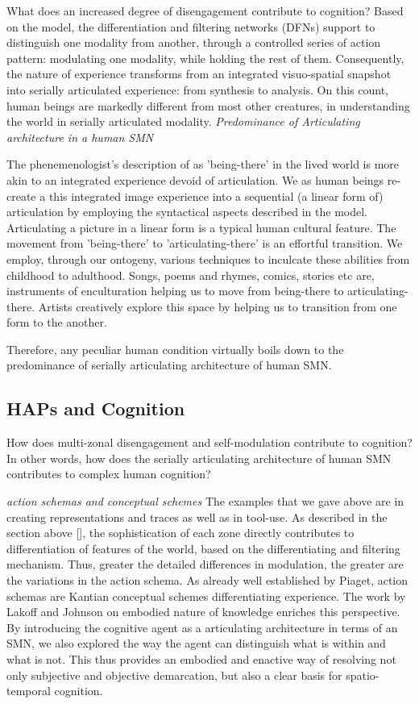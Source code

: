  What does an increased degree of disengagement contribute to cognition? Based on the model, the differentiation and filtering networks (DFNs) support to distinguish one modality from another, through a controlled series of action pattern: modulating one modality, while holding the rest of them. Consequently, the nature of experience transforms from an integrated visuo-spatial snapshot into serially articulated experience: from synthesis to analysis. On this count, human beings are markedly different from most other creatures, in understanding the world in serially articulated modality.  \emph{Predominance of Articulating architecture in a human SMN}

The phenemenologist's description of as 'being-there' in the lived world is more akin to an integrated experience devoid of articulation. We as human beings re-create a this integrated image experience into a sequential (a linear form of) articulation by employing the syntactical aspects described in the model. Articulating a picture in a linear form is a typical human cultural feature. The movement from 'being-there' to 'articulating-there' is an effortful transition. We employ, through our ontogeny, various techniques to inculcate these abilities from childhood to adulthood. Songs, poems and rhymes, comics, stories etc are, instruments of enculturation helping us to move from being-there to articulating-there. Artists creatively explore this space by helping us to transition from one form to the another.

Therefore, any peculiar human condition virtually boils down to the predominance of serially articulating architecture of human SMN. 

\subsection{HAPs and Cognition}
How does multi-zonal disengagement and self-modulation contribute to cognition? In other words, how does the serially articulating architecture of human SMN contributes to complex human cognition?

\emph{action schemas and conceptual schemes} The examples that we gave above are in creating representations and traces as well as in tool-use. As described in the section above [], the sophistication of each zone directly contributes to differentiation of features of the world, based on the differentiating and filtering mechanism. Thus, greater the detailed differences in modulation, the greater are the variations in the action schema. As already well established by Piaget, action schemas are Kantian conceptual schemes differentiating experience. The work by Lakoff and Johnson on embodied nature of knowledge enriches this perspective. By introducing the cognitive agent as a articulating architecture in terms of an SMN, we also explored the way the agent can distinguish what is within and what is not. This thus provides an embodied and enactive way of resolving not only subjective and objective demarcation, but also a clear basis for spatio-temporal cognition.

